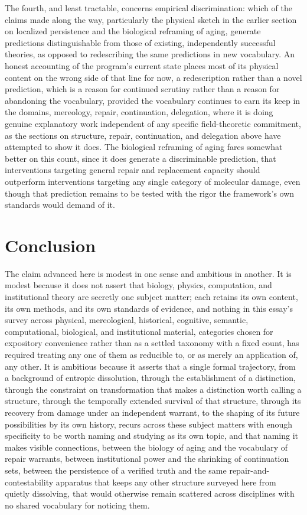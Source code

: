 \documentclass[11pt]{article}
\begin{document}
The fourth, and least tractable, concerns empirical discrimination: which of the claims made along the way, particularly the physical sketch in the earlier section on localized persistence and the biological reframing of aging, generate predictions distinguishable from those of existing, independently successful theories, as opposed to redescribing the same predictions in new vocabulary. An honest accounting of the program's current state places most of its physical content on the wrong side of that line for now, a redescription rather than a novel prediction, which is a reason for continued scrutiny rather than a reason for abandoning the vocabulary, provided the vocabulary continues to earn its keep in the domains, mereology, repair, continuation, delegation, where it is doing genuine explanatory work independent of any specific field-theoretic commitment, as the sections on structure, repair, continuation, and delegation above have attempted to show it does. The biological reframing of aging fares somewhat better on this count, since it does generate a discriminable prediction, that interventions targeting general repair and replacement capacity should outperform interventions targeting any single category of molecular damage, even though that prediction remains to be tested with the rigor the framework's own standards would demand of it.

\section{Conclusion}

The claim advanced here is modest in one sense and ambitious in another. It is modest because it does not assert that biology, physics, computation, and institutional theory are secretly one subject matter; each retains its own content, its own methods, and its own standards of evidence, and nothing in this essay's survey across physical, mereological, historical, cognitive, semantic, computational, biological, and institutional material, categories chosen for expository convenience rather than as a settled taxonomy with a fixed count, has required treating any one of them as reducible to, or as merely an application of, any other. It is ambitious because it asserts that a single formal trajectory, from a background of entropic dissolution, through the establishment of a distinction, through the constraint on transformation that makes a distinction worth calling a structure, through the temporally extended survival of that structure, through its recovery from damage under an independent warrant, to the shaping of its future possibilities by its own history, recurs across these subject matters with enough specificity to be worth naming and studying as its own topic, and that naming it makes visible connections, between the biology of aging and the vocabulary of repair warrants, between institutional power and the shrinking of continuation sets, between the persistence of a verified truth and the same repair-and-contestability apparatus that keeps any other structure surveyed here from quietly dissolving, that would otherwise remain scattered across disciplines with no shared vocabulary for noticing them.
\end{document}
